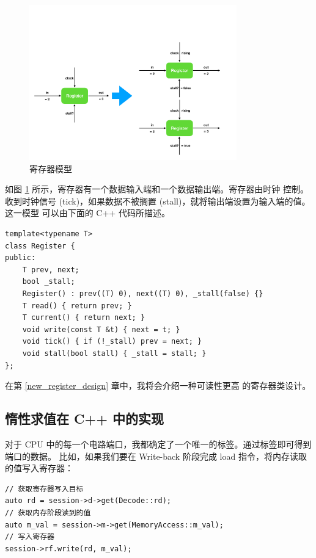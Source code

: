 \documentclass[12pt]{article}
\begin{document}
    \begin{figure}[h]
        \centering
        \includegraphics[page=1,width=0.8\textwidth]{design}
        \caption{寄存器模型}
        \label{fig:register}
    \end{figure}

    如图 \ref{fig:register} 所示，寄存器有一个数据输入端和一个数据输出端。寄存器由时钟
    控制。收到时钟信号 (tick)，如果数据不被搁置 (stall)，就将输出端设置为输入端的值。这一模型
    可以由下面的 C++ 代码所描述。

    \begin{verbatim}
template<typename T>
class Register {
public:
    T prev, next;
    bool _stall;
    Register() : prev((T) 0), next((T) 0), _stall(false) {}
    T read() { return prev; }
    T current() { return next; }
    void write(const T &t) { next = t; }
    void tick() { if (!_stall) prev = next; }
    void stall(bool stall) { _stall = stall; }
};
    \end{verbatim}
    \begin{tcolorbox}
        在第 \ref{new_register_design} 章中，我将会介绍一种可读性更高
        的寄存器类设计。
    \end{tcolorbox}

    \subsection{惰性求值在 C++ 中的实现}

    对于 CPU 中的每一个电路端口，我都确定了一个唯一的标签。通过标签即可得到端口的数据。
    比如，如果我们要在 Write-back 阶段完成 load 指令，将内存读取的值写入寄存器：
    
    \begin{verbatim}
// 获取寄存器写入目标
auto rd = session->d->get(Decode::rd);
// 获取内存阶段读到的值
auto m_val = session->m->get(MemoryAccess::m_val);
// 写入寄存器
session->rf.write(rd, m_val);
    \end{verbatim}
\end{document}
